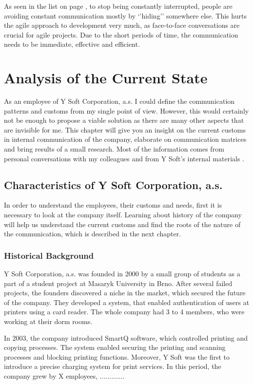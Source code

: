 \documentclass[11pt,singleside]{myfithesis2}
\begin{document}
As seen in the list on page \pageref{list:avoidingCommunication}, to stop being constantly interrupted, people are avoiding constant communication mostly by `'hiding'' somewhere else. This hurts the agile approach to development very much, as face-to-face conversations are crucial for agile projects. Due to the short periods of time, the communication needs to be immediate, effective and efficient.
	
	
\chapter{Analysis of the Current State}

As an employee of Y Soft Corporation, a.s. I could define the communication patterns and customs from my single point of view. However, this would certainly not be enough to propose a viable solution as there are many other aspects that are invisible for me. This chapter will give you an insight on the current customs in internal communication of the company, elaborate on communication matrices and bring results of a small research. Most of the information comes from personal conversations with my colleagues and from Y Soft's internal materials \cite{ysoftInternal}.

	\section{Characteristics of Y Soft Corporation, a.s.}
In order to understand the employees, their customs and needs, first it is necessary to look at the company itself. Learning about history of the company will help us understand the current customs and find the roots of the nature of the communication, which is described in the next chapter.

		\subsection{Historical Background}

Y Soft Corporation, a.s. was founded in 2000 by a small group of students as a part of a student project at Masaryk University in Brno. After several failed projects, the founders discovered a niche in the market, which secured the future of the company. They developed a system, that enabled authentication of users at printers using a card reader. The whole company had 3 to 4 members, who were working at their dorm rooms.

In 2003, the company introduced SmartQ software, which controlled printing and copying processes. The system enabled securing the printing and scanning processes and blocking printing functions. Moreover, Y Soft was the first to introduce a precise charging system for print services. In this period, the company grew by X employees, .............
\end{document}
